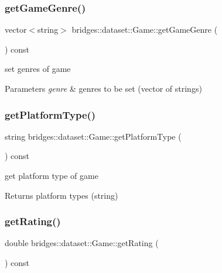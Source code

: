 \subsubsection{\texorpdfstring{get\+Game\+Genre()}{getGameGenre()}}
{\footnotesize\ttfamily vector$<$string$>$ bridges\+::dataset\+::\+Game\+::get\+Game\+Genre (\begin{DoxyParamCaption}{ }\end{DoxyParamCaption}) const\hspace{0.3cm}{\ttfamily [inline]}}

set genres of game 
\begin{DoxyParams}{Parameters}
{\em genre} & genres to be set (vector of strings) \\
\hline
\end{DoxyParams}
\mbox{\label{classbridges_1_1dataset_1_1_game_ab3e2c8d319e7ef0b72d20c2d7153d35b}} 
\subsubsection{\texorpdfstring{get\+Platform\+Type()}{getPlatformType()}}
{\footnotesize\ttfamily string bridges\+::dataset\+::\+Game\+::get\+Platform\+Type (\begin{DoxyParamCaption}{ }\end{DoxyParamCaption}) const\hspace{0.3cm}{\ttfamily [inline]}}

get platform type of game \begin{DoxyReturn}{Returns}
platform types (string) 
\end{DoxyReturn}
\mbox{\label{classbridges_1_1dataset_1_1_game_aaada99b6ee03515d543fd8717fab592c}} 
\subsubsection{\texorpdfstring{get\+Rating()}{getRating()}}
{\footnotesize\ttfamily double bridges\+::dataset\+::\+Game\+::get\+Rating (\begin{DoxyParamCaption}{ }\end{DoxyParamCaption}) const\hspace{0.3cm}{\ttfamily [inline]}}

